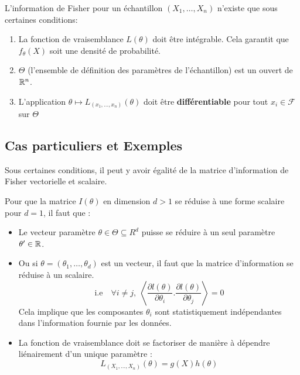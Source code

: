 \begin{proposition}[CR]
    L'information de Fisher pour un échantillon $(X_1, \dots, X_n)$ n'existe que sous certaines conditions: 
    \begin{enumerate}
        \item La fonction de vraisemblance $L(\theta)$ doit être intégrable. Cela garantit que $f_\theta(X)$ soit 
            une densité de probabilité. 
        \item $\Theta$ (l'ensemble de définition des paramètres de l'échantillon) est un ouvert de $\mathbb{R}^n$. 
        \item L'application $\theta \mapsto L_{(x_1, \dots, x_n)}(\theta)$ doit être \textbf{différentiable} pour tout $x_i \in \mathcal{F}$ sur $\Theta$ 
    \end{enumerate}
\end{proposition}

\subsection{Cas particuliers et Exemples}

Sous certaines conditions, il peut y avoir égalité de la matrice d'information de Fisher vectorielle et scalaire. 

Pour que la matrice $I(\theta)$ en dimension $d > 1$ se réduise à une forme scalaire pour $d = 1$, il faut que :
\begin{itemize}
    \item Le vecteur paramètre $\theta \in \Theta \subseteq R^d$ puisse se réduire à un seul paramètre $\theta' \in \mathbb{R}$. 
    \item Ou si $\theta = (\theta_1, \dots, \theta_d)$ est un vecteur, il faut que la matrice d'information se réduise à 
        un scalaire. 
            \[ \text{i.e} \quad \forall i \not = j, \; \left\langle \frac{\partial l(\theta)}{\partial \theta_i} . \frac{\partial l(\theta)}{\partial \theta_j} \right\rangle = 0 \] 
        Cela implique que les composantes $\theta_i$ sont statistiquement indépendantes dans l'information fournie par les données. 
    \item La fonction de vraisemblance doit se factoriser de manière à dépendre liénairement d'un unique paramètre :
        \[ L_{(X_1, \dots, X_n)}(\theta) = g(X)h(\theta) \]  
\end{itemize}

















